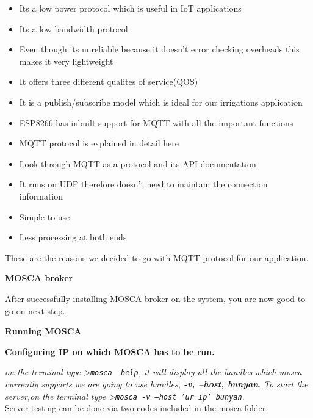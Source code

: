 \documentclass[16pt]{article}
\begin{document}
\begin{itemize}

\item
  Its a low power protocol which is useful in IoT applications
\item
  Its a low bandwidth protocol
\item
  Even though its unreliable because it doesn't error checking overheads
  this makes it very lightweight
\item
  It offers three different qualites of service(QOS)
\item
  It is a publish/subscribe model which is ideal for our irrigations
  application
\item
  ESP8266 has inbuilt support for MQTT with all the important functions
\item
  MQTT protocol is explained in detail here
\item
  Look through MQTT as a protocol and its API documentation
\item
  It runs on UDP therefore doesn't need to maintain the connection
  information
\item
  Simple to use
\item
  Less processing at both ends
\end{itemize}

These are the reasons we decided to go with MQTT protocol for our
application.

\vspace{13cm}

{\LARGE{\textbf{MOSCA broker}}}

\vspace{0.5cm}

After successfully installing MOSCA broker on the system, you are now
good to go on next step.

\vspace{0.5cm}
{\Large{\textbf{Running MOSCA}}}


{\textbf{Configuring IP on which MOSCA has to be run.}}

\emph{on the terminal type \textgreater{}\texttt{mosca -help}, it will
display all the handles which mosca currently supports we are going to
use handles, {\textbf{-v, --host, \textbar{} bunyan}}}. \emph{To start the server,on
the terminal type \textgreater{}\texttt{mosca -v --host 'ur ip'
\textbar{}bunyan}}. \\ Server testing can be done via two codes included in
the mosca folder.
\end{document}
